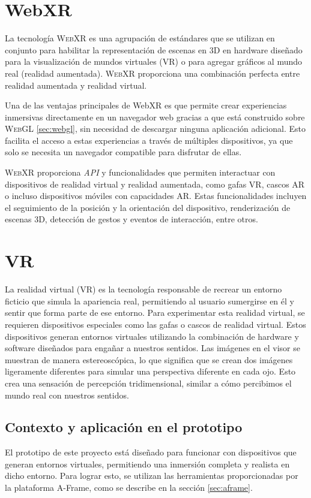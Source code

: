 \documentclass[a4paper, 11pt]{book}
\begin{document}
\section{WebXR}
La tecnología \textsc{WebXR} es una agrupación de estándares que se utilizan en conjunto para habilitar la representación de escenas en 3D en hardware diseñado para la visualización de mundos virtuales (VR) o para agregar gráficos al mundo real (realidad aumentada). \textsc{WebXR} proporciona una combinación perfecta entre realidad aumentada y realidad virtual.

Una de las ventajas principales de WebXR es que permite crear experiencias inmersivas directamente en un navegador web gracias a que está construido sobre \textsc{WebGL} \ref{sec:webgl}, sin necesidad de descargar ninguna aplicación adicional. Esto facilita el acceso a estas experiencias a través de múltiples dispositivos, ya que solo se necesita un navegador compatible para disfrutar de ellas.

\textsc{WebXR} proporciona \emph{API} y funcionalidades que permiten interactuar con dispositivos de realidad virtual y realidad aumentada, como gafas \textsc{VR}, cascos \textsc{AR} o incluso dispositivos móviles con capacidades \textsc{AR}. Estas funcionalidades incluyen el seguimiento de la posición y la orientación del dispositivo, renderización de escenas \textsc{3D}, detección de gestos y eventos de interacción, entre otros.

\section{VR}
La realidad virtual (VR) es la tecnología responsable de recrear un entorno ficticio que simula la apariencia real, permitiendo al usuario sumergirse en él y sentir que forma parte de ese entorno. Para experimentar esta realidad virtual, se requieren dispositivos especiales como las gafas o cascos de realidad virtual. Estos dispositivos generan entornos virtuales utilizando la combinación de hardware y software diseñados para engañar a nuestros sentidos. Las imágenes en el visor se muestran de manera estereoscópica, lo que significa que se crean dos imágenes ligeramente diferentes para simular una perspectiva diferente en cada ojo. Esto crea una sensación de percepción tridimensional, similar a cómo percibimos el mundo real con nuestros sentidos.
\subsection{Contexto y aplicación en el prototipo}
El prototipo de este proyecto está diseñado para funcionar con dispositivos que generan entornos virtuales, permitiendo una inmersión completa y realista en dicho entorno. Para lograr esto, se utilizan las herramientas proporcionadas por la plataforma A-Frame, como se describe en la sección \ref{sec:aframe}. 
\end{document}
